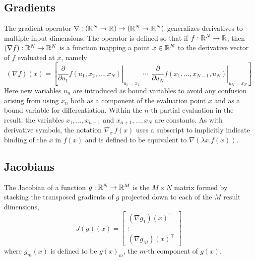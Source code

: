 \documentclass[10pt]{article}
\begin{document}
\subsection{Gradients}

The gradient operator $\nabla:(\mathbb{R}^N \rightarrow \mathbb{R})\rightarrow
(\mathbb{R}^N \rightarrow \mathbb{R}^N)$ generalizes derivatives to multiple
input dimensions.  The operator is defined so that if
$f : \mathbb{R}^N \rightarrow \mathbb{R}$, then $(\nabla f):\mathbb{R}^N \rightarrow
\mathbb{R}^N$ is a function mapping a point $x \in \mathbb{R}^N$ to the
derivative vector of $f$ evaluated at $x$, namely
%
\[
(\nabla f)(x) 
= 
\left[
  \left. 
    \frac{\partial}{\partial u_1} f(u_1,x_2,\ldots,x_N)
  \right|_{u_1 = x_1}
  \ \ \cdots \ \ 
  \left. 
    \frac{\partial}{\partial u_N}  f(x_1,\ldots,x_{N-1},u_N)
   \right|_{u_N = x_N}
\right]
\]
%
Here new variables $u_n$ are introduced as bound variables to avoid
any confusion arising from using $x_n$ both as a component of the
evaluation point $x$ and as a bound variable for differentiation.
Within the $n$-th partial evaluation in the result, the variables
$x_1,\ldots,x_{n-1}$ and $x_{n+1},\ldots,x_N$ are constants.  As with
derivative symbols, the notation $\nabla_{\!x} \, f(x)$ uses a
subscript to implicitly indicate binding of the $x$ in $f(x)$ and is
defined to be equivalent to $\nabla(\lambda x. f(x))$.

\subsection{Jacobians}

The Jacobian of a function $g : \mathbb{R}^N \rightarrow \mathbb{R}^M$ is 
the $M \times N$ matrix formed by stacking the transposed gradients of $g$ projected down to
each of the $M$ result dimensions,
%
\[
J(g)(x) = 
\left[
\begin{array}{c}
(\nabla g_1)(x)^{\top}
\\[2pt]
\vdots
\\[2pt]
(\nabla g_M)(x)^{\top}
\end{array}
\right]
\]
%
where $g_m(x)$ is defined to be $g(x)_m$, the $m$-th component of $g(x)$.

\clearpage
\nocite{Hogan:2014}
\nocite{Bell:2012}
\nocite{VandevoordeJosuttis:2002}
\nocite{Giles:2008}
\nocite{Gay:2005}
\nocite{GriewankWalther:2008}
\nocite{Fog:2014}
\nocite{Hogan:2014}
\nocite{Neal:2003}



\end{document}
